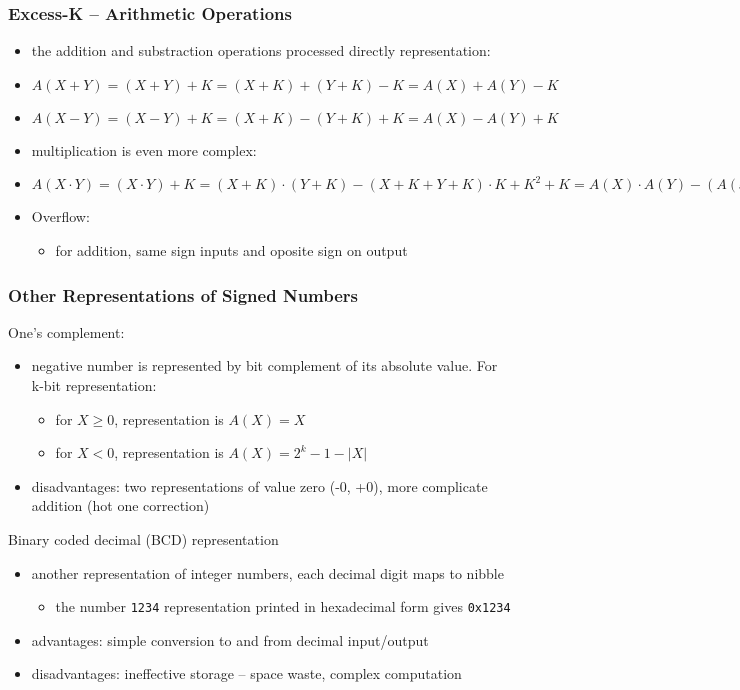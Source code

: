 \documentclass{beamer}
\begin{document}
\begin{frame}
\frametitle{Excess-K -- Arithmetic Operations}

\begin{itemize}
\item the addition and substraction operations processed directly representation:
\item $A ( X + Y )=( X + Y )+ K =( X + K ) + (Y + K ) - K = A ( X )+ A (Y ) -K$
\item $A ( X - Y )=( X - Y )+ K =( X + K ) - (Y +K )+K = A ( X ) - A (Y )+K$
\item multiplication is even more complex:
\item $A ( X \cdot Y )=( X \cdot Y )+K =( X + K )\cdot(Y + K )-( X + K +Y +K )\cdot K + K^2+ K
= A ( X )\cdot A (Y ) - ( A ( x)+ A ( y ))\cdot K + K^2 +K$
\end{itemize}
\bigskip
\begin{itemize}
\item Overflow:
\begin{itemize}
\item for addition, same sign inputs and oposite sign on output
\end{itemize}
\end{itemize}
\end{frame}


\begin{frame}
\frametitle{Other Representations of Signed Numbers}

One's complement:
\begin{itemize}
\item negative number is represented by bit complement of its absolute value. For k-bit representation:
\begin{itemize}
\item for $X\ge0$, representation is $A(X) = X$
\item for $X<0$, representation is $A(X) = 2^k-1-|X|$
\end{itemize}
\item disadvantages: two representations of value zero (-0, +0), more complicate addition (hot one correction)
\end{itemize}
\bigskip
Binary coded decimal (BCD) representation
\begin{itemize}
\item another representation of integer numbers, each decimal digit maps to nibble 
\begin{itemize}
\item the number \texttt{1234} representation printed in hexadecimal form gives \texttt{0x1234}
\end{itemize}
\item advantages: simple conversion to and from decimal input/output
\item disadvantages: ineffective storage -- space waste, complex computation
\end{itemize}
\end{frame}
\end{document}
